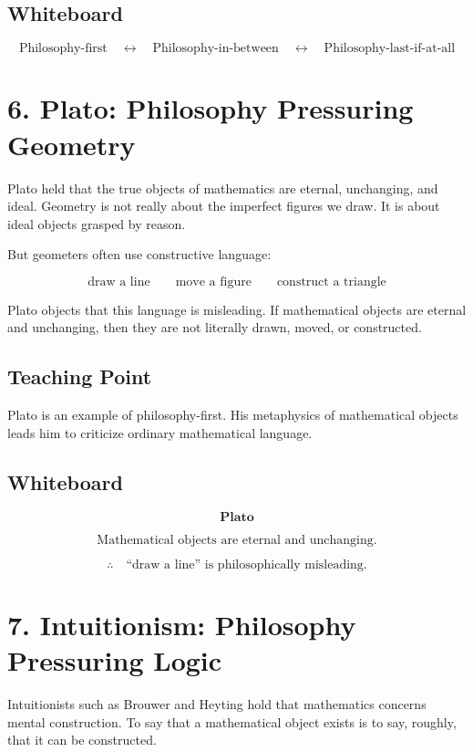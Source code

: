 \documentclass[11pt]{article}
\begin{document}
\subsection*{Whiteboard}

\[
\text{Philosophy-first}
\quad \longleftrightarrow \quad
\text{Philosophy-in-between}
\quad \longleftrightarrow \quad
\text{Philosophy-last-if-at-all}
\]

\section*{6. Plato: Philosophy Pressuring Geometry}

Plato held that the true objects of mathematics are eternal, unchanging, and ideal.
Geometry is not really about the imperfect figures we draw. It is about ideal objects
grasped by reason.

But geometers often use constructive language:

\[
\text{draw a line}
\qquad
\text{move a figure}
\qquad
\text{construct a triangle}
\]

Plato objects that this language is misleading. If mathematical objects are eternal and
unchanging, then they are not literally drawn, moved, or constructed.

\subsection*{Teaching Point}

Plato is an example of philosophy-first. His metaphysics of mathematical objects leads him
to criticize ordinary mathematical language.

\subsection*{Whiteboard}

\[
\textbf{Plato}
\]

\[
\text{Mathematical objects are eternal and unchanging.}
\]

\[
\therefore \quad \text{``draw a line'' is philosophically misleading.}
\]

\section*{7. Intuitionism: Philosophy Pressuring Logic}

Intuitionists such as Brouwer and Heyting hold that mathematics concerns mental
construction. To say that a mathematical object exists is to say, roughly, that it can be
constructed.
\end{document}
